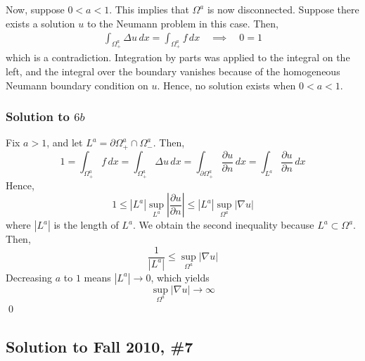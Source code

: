 Now, suppose $0<a<1$. This implies that $\Omega^a$ is now disconnected. Suppose there exists a solution $u$ to the Neumann problem in this case. Then,
\begin{align*}
\int_{\Omega_+^a} \Delta u \, dx = \int_{\Omega_+^a} f \, dx \quad \implies \quad 0 = 1	
\end{align*}
which is a contradiction. Integration by parts was applied to the integral on the left, and the integral over the boundary vanishes because of the homogeneous Neumann boundary condition on $u$. Hence, no solution exists when $0<a<1$.

\subsubsection*{Solution to $6b$}

Fix $a>1$, and let $L^a = \partial \Omega_+^a \cap \Omega_-^a$. Then,
$$ 1 = \int_{\Omega_+^a} f \, dx = \int_{\Omega_+^a} \Delta u \, dx = \int_{\partial \Omega_+^a} \frac{\partial u}{\partial n} \, dx = \int_{L^a} \frac{\partial u}{\partial n} \, dx $$
Hence,
$$ 1 \leq |L^a| \sup_{L^a} \left| \frac{\partial u}{\partial n} \right| \leq |L^a| \sup_{\Omega^a} |\nabla u| $$
where $|L^a|$ is the length of $L^a$. We obtain the second inequality because $L^a \subset \Omega^a$. Then,
$$ \frac{1}{|L^a|} \leq \sup_{\Omega^a} |\nabla u| $$
Decreasing $a$ to $1$ means $|L^a| \to 0$, which yields
$$\sup_{\Omega^a} |\nabla u| \to \infty$$ \hfill \qed


\subsection*{Solution to Fall 2010, \#7}
\label{F10Q7}

